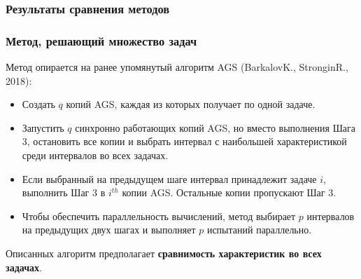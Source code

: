 \documentclass[aspectratio=1610]{beamer}
\begin{document}
\begin{frame}
  \frametitle{Результаты сравнения методов}
  \begin{figure}[ht]
    \centering
  \end{figure}
\end{frame}


\begin{frame}
  \frametitle{Метод, решающий множество задач}
  Метод опирается на ранее упомянутый алгоритм AGS (BarkalovK., StronginR., 2018):
  \begin{itemize}
    \item Создать \(q\) копий AGS, каждая из которых получает по одной задаче.
    \item Запустить \(q\) синхронно работающих копий AGS, но вместо выполнения Шага 3,
    остановить все копии и выбрать интервал с наибольшей характеристикой среди интервалов во всех задачах.
    \item Если выбранный на предыдущем шаге интервал принадлежит задаче \(i\), выполнить Шаг 3 в \(i^{th}\) копии AGS.
    Остальные копии пропускают Шаг 3.
    \item Чтобы обеспечить параллельность вычислений, метод выбирает \(p\) интервалов на предыдущих
    двух шагах и выполняет \(p\) испытаний параллельно.
  \end{itemize}
  Описанных алгоритм предполагает \textbf{сравнимость характеристик во всех задачах}.
\end{frame}
\end{document}
